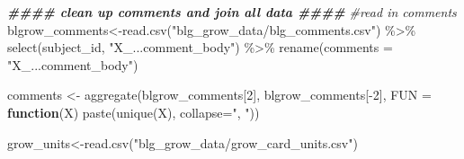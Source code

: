 \documentclass[
]{article}
\newenvironment{Shaded}{\begin{snugshade}}{\end{snugshade}}
\newcommand{\AttributeTok}[1]{\textcolor[rgb]{0.77,0.63,0.00}{#1}}
\newcommand{\CommentTok}[1]{\textcolor[rgb]{0.56,0.35,0.01}{\textit{#1}}}
\newcommand{\ControlFlowTok}[1]{\textcolor[rgb]{0.13,0.29,0.53}{\textbf{#1}}}
\newcommand{\DecValTok}[1]{\textcolor[rgb]{0.00,0.00,0.81}{#1}}
\newcommand{\DocumentationTok}[1]{\textcolor[rgb]{0.56,0.35,0.01}{\textbf{\textit{#1}}}}
\newcommand{\FunctionTok}[1]{\textcolor[rgb]{0.00,0.00,0.00}{#1}}
\newcommand{\NormalTok}[1]{#1}
\newcommand{\OtherTok}[1]{\textcolor[rgb]{0.56,0.35,0.01}{#1}}
\newcommand{\SpecialCharTok}[1]{\textcolor[rgb]{0.00,0.00,0.00}{#1}}
\newcommand{\StringTok}[1]{\textcolor[rgb]{0.31,0.60,0.02}{#1}}
\begin{document}
\begin{Shaded}
\begin{Highlighting}[]
\DocumentationTok{\#\#\#\# clean up comments and join all data \#\#\#\# }
\CommentTok{\#read in comments }
\NormalTok{blgrow\_comments}\OtherTok{\textless{}{-}}\FunctionTok{read.csv}\NormalTok{(}\StringTok{"blg\_grow\_data/blg\_comments.csv"}\NormalTok{) }\SpecialCharTok{\%\textgreater{}\%}
  \FunctionTok{select}\NormalTok{(subject\_id, }\StringTok{"X\_...comment\_body"}\NormalTok{) }\SpecialCharTok{\%\textgreater{}\%}
  \FunctionTok{rename}\NormalTok{(}\AttributeTok{comments =} \StringTok{"X\_...comment\_body"}\NormalTok{)}

\NormalTok{comments }\OtherTok{\textless{}{-}} \FunctionTok{aggregate}\NormalTok{(blgrow\_comments[}\DecValTok{2}\NormalTok{], blgrow\_comments[}\SpecialCharTok{{-}}\DecValTok{2}\NormalTok{], }
                      \AttributeTok{FUN =} \ControlFlowTok{function}\NormalTok{(X) }\FunctionTok{paste}\NormalTok{(}\FunctionTok{unique}\NormalTok{(X), }\AttributeTok{collapse=}\StringTok{", "}\NormalTok{))}

\NormalTok{grow\_units}\OtherTok{\textless{}{-}}\FunctionTok{read.csv}\NormalTok{(}\StringTok{"blg\_grow\_data/grow\_card\_units.csv"}\NormalTok{)  }


\end{Highlighting}
\end{Shaded}
\end{document}
